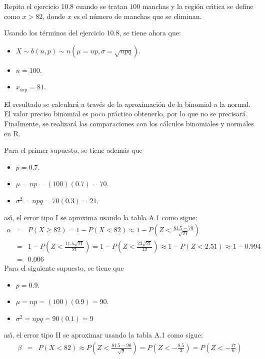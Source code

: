 \begin{enunciado}
 Repita el ejercicio 10.8 cuando se tratan $100$ manchas y la regi\'on cr\'{\i}tica se define como $x > 82$, donde $x$ es el n\'umero de manchas que se eliminan.
\end{enunciado}

\begin{solucion}
 Usando los t\'erminos del ejercicio 10.8, se tiene ahora que:
 \begin{itemize}
  \item $X \sim b(n,p) \sim n\left( \mu = np, \sigma = \sqrt{npq} \right)$.
  \item $n = 100$.
  \item $x_{\text{sup}} = 81$.
 \end{itemize}
 El resultado se calcular\'a a trav\'es de la aproximaci\'on de la binomial a la normal. El valor preciso binomial es poco pr\'actico obtenerlo, por lo que no se precisar\'a. Finalmente, se realizar\'a las comparaciones con los c\'alculos binomiales y normales en R.
 \par 
 Para el primer supuesto, se tiene adem\'as que
 \begin{itemize}
  \item $p = 0.7$.
  \item $\mu = np = (100)(0.7) = 70$.
  \item $\sigma^2 = npq = 70(0.3) = 21$.
 \end{itemize}
 as\'{\i}, el error tipo I se aproxima usando la tabla A.1 como sigue:
 \begin{eqnarray*}
  \alpha & = & P(X \geq 82) = 1 - P(X < 82) \approx 1 - P\left( Z < \frac{81.5 - 70}{\sqrt{21}} \right) \\
  & = & 1 - P\left( Z < \frac{11.5\sqrt{21}}{21} \right) = 1- P\left( Z < \frac{23\sqrt{21}}{42} \right) \approx 1 - P(Z <  2.51) \approx 1 - 0.994 \\
  & = & 0.006
 \end{eqnarray*}
 Para el siguiente supuesto, se tiene que
 \begin{itemize}
  \item $p = 0.9$.
  \item $\mu = np = (100)(0.9) = 90$.
  \item $\sigma^2 = npq = 90(0.1) = 9$
 \end{itemize}
 as\'{\i}, el error tipo II se aproximar usando la tabla A.1 como sigue:
 \begin{eqnarray*}
  \beta & = & P(X < 82) \approx P\left( Z < \frac{81.5 - 90}{\sqrt{9}} \right) = P\left( Z < -\frac{8.5}{3} \right) = P\left( Z < -\frac{17}{6} \right) \\

\end{eqnarray*}
\end{solucion}
